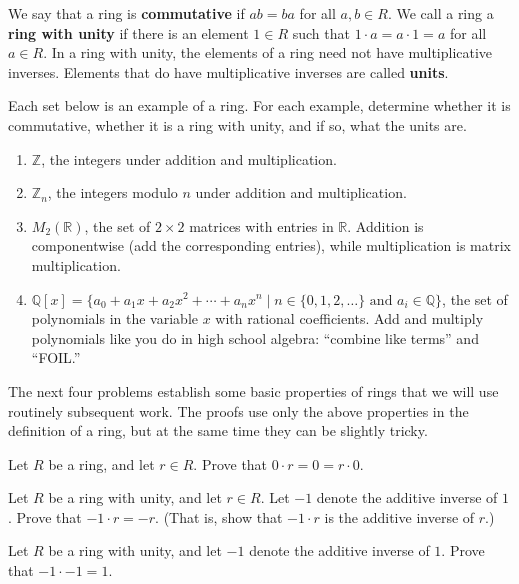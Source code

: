 We say that a ring is \textbf{commutative} if \(ab = ba\) for all \(a,b\in R\).
We call a ring a \textbf{ring with unity} if there is an element \(1\in R\) such that \(1\cdot a = a\cdot 1=a\) for all \(a\in R\).
In a ring with unity, the elements of a ring need not have multiplicative inverses. Elements that do have multiplicative inverses are called \textbf{units}.

\begin{problem}
Each set below is an example of a ring. For each example, determine whether it is commutative, whether it is a ring with unity, and if so, what the units are.
\begin{enumerate}
  \item \(\mathbb{Z}\), the integers under addition and multiplication.
  \item \(\mathbb{Z}_n\), the integers modulo \(n\) under addition and multiplication.
  \item \(M_2(\mathbb{R})\), the set of \(2\times 2\) matrices with entries in \(\mathbb{R}\). Addition is componentwise (add the corresponding entries), while multiplication is matrix multiplication.
  \item \(\mathbb{Q}[x]=\{a_0+a_1x+a_2x^2+\cdots+a_nx^n \mid n\in \{0,1,2,\ldots\}\mbox{ and } a_i\in \mathbb{Q}\}\), the set of polynomials in the variable \(x\) with rational coefficients. Add and multiply polynomials like you do in high school algebra: ``combine like terms'' and ``FOIL.''
\end{enumerate}
\end{problem}

The next four problems establish some basic properties of rings that we will use routinely subsequent work. The proofs use only the above properties in the definition of a ring, but at the same time they can be slightly tricky.

\begin{problem}
Let \(R\) be a ring, and let \(r\in R\). Prove that \(0\cdot r = 0 = r\cdot 0\).
\end{problem}

\begin{problem}
Let \(R\) be a ring with unity, and let \(r\in R\). Let \(-1\) denote the additive inverse of \(1\). Prove that \(-1\cdot r = -r\). (That is, show that \(-1 \cdot r\) is the additive inverse of \(r\).)
\end{problem}

\begin{problem}
Let \(R\) be a ring with unity, and let \(-1\) denote the additive inverse of \(1\). Prove that \(-1 \cdot -1 = 1 \).
\end{problem}

